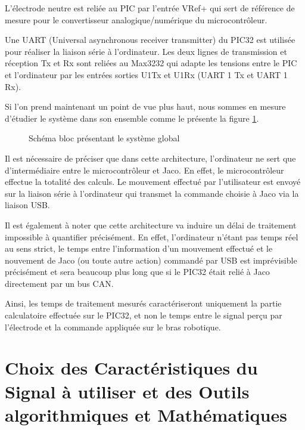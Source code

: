 \documentclass[letterpaper, twoside, 12pt, memoire, creativecommons, hyperref]{thETS}
\begin{document}
L'électrode neutre est reliée au PIC par l'entrée VRef+ qui sert de référence de mesure pour le convertisseur analogique/numérique du microcontrôleur. 

Une UART (Universal asynchronous receiver transmitter) du PIC32 est utilisée pour réaliser la liaison série à l'ordinateur. Les deux lignes de transmission et réception Tx et Rx sont reliées au Max3232 qui adapte les tensions entre le PIC et l'ordinateur par les entrées sorties U1Tx et U1Rx (UART 1 Tx et UART 1 Rx).

Si l'on prend maintenant un point de vue plus haut, nous sommes en mesure d'étudier le système dans son ensemble comme le présente la figure \ref{fig:archiMatTot}.

\begin{figure}
	\centering
	\caption{Schéma bloc présentant le système global}
	\label{fig:archiMatTot}
\end{figure}

Il est nécessaire de préciser que dans cette architecture, l'ordinateur ne sert que d'intermédiaire entre le microcontrôleur et Jaco. En effet, le microcontrôleur effectue la totalité des calculs. Le mouvement effectué par l'utilisateur est envoyé sur la liaison série à l'ordinateur qui transmet la commande choisie à Jaco via la liaison USB. 

Il est également à noter que cette architecture va induire un délai de traitement impossible à quantifier précisément. En effet, l'ordinateur n'étant pas temps réel au sens strict, le temps entre l'information d'un mouvement effectué et le nouvement de Jaco (ou toute autre action) commandé par USB est imprévisible précisément et sera beaucoup plus long que si le PIC32 était relié à Jaco directement par un bus CAN. 

Ainsi, les temps de traitement mesurés caractériseront uniquement la partie calculatoire effectuée sur le PIC32, et non le temps entre le signal perçu par l'électrode et la commande appliquée sur le bras robotique.

\section{Choix des Caractéristiques du Signal à utiliser et des Outils algorithmiques et Mathématiques}
\end{document}
